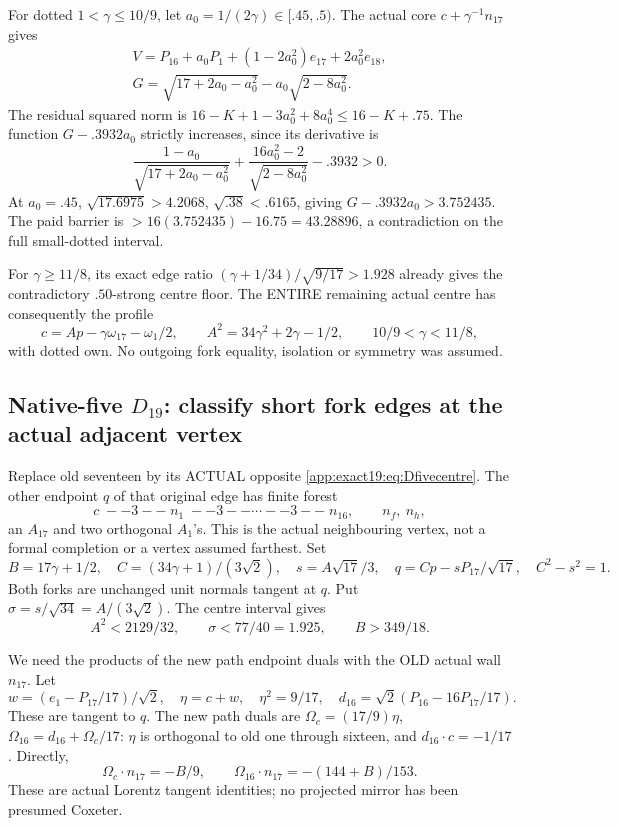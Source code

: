 \documentclass[11pt]{article}
\theoremstyle{definition}
\theoremstyle{remark}
\begin{document}
For dotted \(1<\gamma\le10/9\),
let \(a_0=1/(2\gamma)\in[.45,.5)\).
The actual core
\(c+\gamma^{-1}n_{17}\) gives
\[
 \begin{gathered}
 V=P_{16}+a_0P_1+(1-2a_0^2)e_{17}+2a_0^2e_{18},\\
 G=\sqrt{17+2a_0-a_0^2}-a_0\sqrt{2-8a_0^2}.
 \end{gathered}
\]
The residual squared norm is
\(16-K+1-3a_0^2+8a_0^4\le16-K+.75\).
The function \(G-.3932a_0\)
strictly increases, since its
derivative is
\[
 \frac{1-a_0}{\sqrt{17+2a_0-a_0^2}}
       +\frac{16a_0^2-2}{\sqrt{2-8a_0^2}}-.3932>0 .
\]
At \(a_0=.45\),
\(\sqrt{17.6975}>4.2068\),
\(\sqrt{.38}<.6165\), giving
\(G-.3932a_0>3.752435\).
The paid barrier is
\(>16(3.752435)-16.75=43.28896\),
a contradiction on the full
small-dotted interval.

For \(\gamma\ge11/8\), its exact
edge ratio
\((\gamma+1/34)/\sqrt{9/17}>1.928\)
already gives the contradictory
\(.50\)-strong centre floor.
The ENTIRE remaining actual
centre has consequently the
profile
\[
 c=Ap-\gamma\omega_{17}-\omega_1/2,\qquad
 A^2=34\gamma^2+2\gamma-1/2,\qquad
                              10/9<\gamma<11/8 ,
\tag{D19fivecentre}\label{app:exact19:eq:Dfivecentre}
\]
with dotted own.
No outgoing fork equality,
isolation or symmetry was
assumed.


\subsection[Native-five D19: classify short fork edges at the actual adjacent vertex]{Native-five \(D_{19}\): classify short fork edges at the actual adjacent vertex}
\label{app:exact19:Dfiveq}

Replace old seventeen by its
ACTUAL opposite
\eqref{app:exact19:eq:Dfivecentre}.
The other endpoint \(q\) of that
original edge has finite forest
\[
                   c\;--3--\;n_1\;--3--\cdots--3--\;n_{16},
                     \qquad n_f,\ n_h ,
\]
an \(A_{17}\) and two orthogonal
\(A_1\)'s.
This is the actual neighbouring
vertex, not a formal completion
or a vertex assumed farthest.
Set
\[
 B=17\gamma+1/2,\quad
 C=(34\gamma+1)/(3\sqrt2),\quad
 s=A\sqrt{17}/3,\quad
                   q=Cp-sP_{17}/\sqrt{17},\quad C^2-s^2=1 .
\]
Both forks are unchanged unit
normals tangent at \(q\).
Put \(\sigma=s/\sqrt{34}=A/(3\sqrt2)\).
The centre interval gives
\[
                 A^2<2129/32,\qquad \sigma<77/40=1.925,
                                  \qquad B>349/18 .
\]

We need the products of the new
path endpoint duals with the OLD
actual wall \(n_{17}\).
Let
\[
 w=(e_1-P_{17}/17)/\sqrt2,\quad
 \eta=c+w,\quad\eta^2=9/17,\quad
 d_{16}=\sqrt2(P_{16}-16P_{17}/17).
\]
These are tangent to \(q\).
The new path duals are
\(\Omega_c=(17/9)\eta\),
\(\Omega_{16}=d_{16}+\Omega_c/17\):
\(\eta\) is orthogonal to old
one through sixteen, and
\(d_{16}\cdot c=-1/17\).
Directly,
\[
                 \Omega_c\cdot n_{17}=-B/9,\qquad
                 \Omega_{16}\cdot n_{17}=-(144+B)/153 .
\tag{D19qduals}\label{app:exact19:eq:Dqduals}
\]
These are actual Lorentz tangent
identities; no projected mirror
has been presumed Coxeter.
\end{document}
